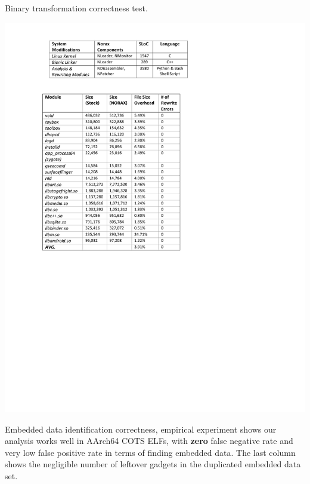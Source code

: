 
\begin{table}[h]
	\centering
	\begin{minipage}[b]{0.45\textwidth}
		\centering	
\caption{Binary transformation correctness test.}
\label{tab:eval-rewrite}
\includegraphics[scale=0.80]{norax/figures/rewrite-correctness}
	\end{minipage}
 	\hfill
	\begin{minipage}[b]{0.5\textwidth}
		\centering	
\caption{Embedded data identification correctness, empirical experiment
shows our analysis works well in AArch64 COTS ELFs, with {\bf zero} false negative rate and very low false positive rate in terms of finding embedded data. The last column shows the negligible number of leftover gadgets in the duplicated embedded data set.}
\label{tab:embedgadgets}

\end{minipage}
\end{table}
